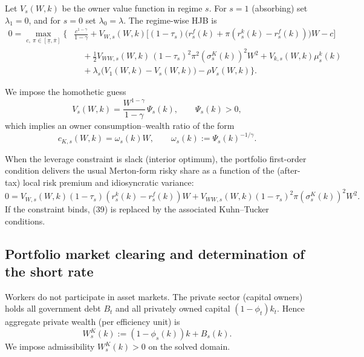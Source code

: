 \documentclass{article}
\begin{document}
Let $V_s(W,k)$ be the owner value function in regime $s$. For $s=1$ (absorbing) set $\lambda_1=0$, and for $s=0$ set $\lambda_0=\lambda$. The regime-wise HJB is
\begin{equation}
\begin{aligned}
0
=
\max_{c,\ \pi \in [\underline{\pi},\overline{\pi}]}
\Bigg\{
&\frac{c^{1-\gamma}}{1-\gamma}
+ V_{W,s}(W,k)\Big[(1-\tau_s)\big(r^f_s(k)+\pi(r^k_s(k)-r^f_s(k))\big)W - c\Big]
\\
&\quad
+\frac{1}{2}V_{WW,s}(W,k)\,(1-\tau_s)^2\pi^2(\sigma^K_s(k))^2W^2
+V_{k,s}(W,k)\mu^k_s(k)
\\
&\quad
+\lambda_s\big(V_1(W,k)-V_s(W,k)\big)
-\rho V_s(W,k)
\Bigg\}.
\end{aligned}
\tag{36}
\end{equation}

We impose the homothetic guess
\begin{equation}
V_s(W,k)=\frac{W^{1-\gamma}}{1-\gamma}\,\Psi_s(k),\qquad \Psi_s(k)>0,
\tag{37}
\end{equation}
which implies an owner consumption--wealth ratio of the form
\begin{equation}
c_{K,s}(W,k)=\omega_s(k)W,\qquad \omega_s(k):=\Psi_s(k)^{-1/\gamma}.
\tag{38}
\end{equation}

When the leverage constraint is slack (interior optimum), the portfolio first-order condition delivers the usual Merton-form risky share as a function of the (after-tax) local risk premium and idiosyncratic variance:
\begin{equation}
0
=
V_{W,s}(W,k)(1-\tau_s)(r^k_s(k)-r^f_s(k))W
+
V_{WW,s}(W,k)(1-\tau_s)^2\pi(\sigma^K_s(k))^2W^2.
\tag{39}
\end{equation}
If the constraint binds, (39) is replaced by the associated Kuhn--Tucker conditions.

\subsection{Portfolio market clearing and determination of the short rate}
Workers do not participate in asset markets. The private sector (capital owners) holds all government debt $B_t$ and all privately owned capital $(1-\phi_t)k_t$. Hence aggregate private wealth (per efficiency unit) is
\begin{equation}
W^K_s(k):=(1-\phi_s(k))k+B_s(k).
\tag{40}
\end{equation}
We impose admissibility $W^K_s(k)>0$ on the solved domain.
\end{document}
